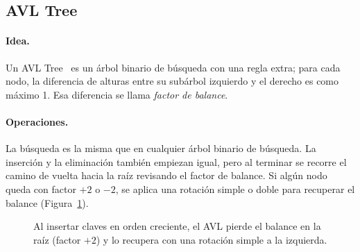 \documentclass[11pt,a4paper]{article}
\begin{document}
\subsection{AVL Tree}

\paragraph{Idea.}
Un AVL Tree~\cite{avl1962} es un árbol binario de búsqueda con una regla extra;
para cada nodo, la diferencia de alturas entre su subárbol izquierdo y el
derecho es como máximo 1. Esa diferencia se llama \emph{factor de balance}.

\paragraph{Operaciones.}
La búsqueda es la misma que en cualquier árbol binario de búsqueda. La
inserción y la eliminación también empiezan igual, pero al terminar se
recorre el camino de vuelta hacia la raíz revisando el factor de balance. Si
algún nodo queda con factor $+2$ o $-2$, se aplica una rotación simple o doble
para recuperar el balance (Figura~\ref{fig:avl}).

\begin{figure}[!htb]
\centering
{}
\caption{Al insertar claves en orden creciente, el AVL pierde el balance en la
raíz (factor $+2$) y lo recupera con una rotación simple a la izquierda.}
\label{fig:avl}
\end{figure}
\end{document}
